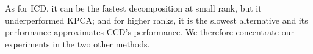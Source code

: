 As for ICD, it can be the fastest decomposition at small rank, but it underperformed KPCA; and for higher ranks, it is the slowest alternative and its performance approximates CCD's performance. We therefore concentrate our experiments in the two other methods. 


